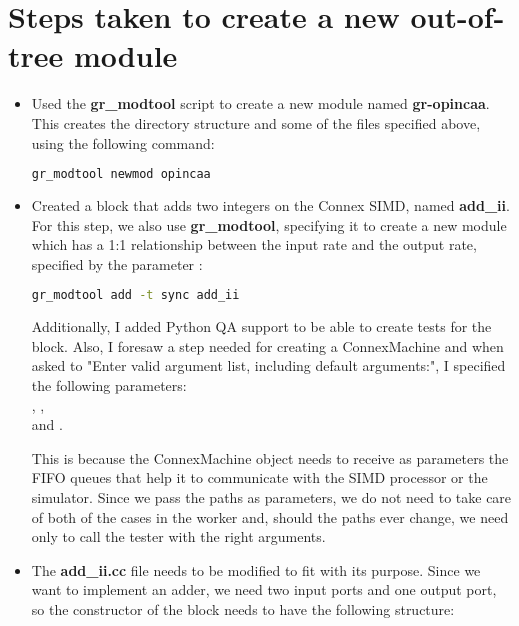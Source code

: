 
\section{Steps taken to create a new out-of-tree module}
\label{sec:steps-oot}
\begin{itemize}
	\item Used the \textbf{gr\_modtool} script to create a new module named
		\textbf{gr-opincaa}. This creates the directory structure and some of the
		files specified above, using the following command:\\
	
		\begin{lstlisting}[language=bash]
gr_modtool newmod opincaa
		\end{lstlisting}
	
	\item Created a block that adds two integers on the Connex SIMD, named
		\textbf{add\_ii}. For this step, we also use \textbf{gr\_modtool},
		specifying it to create a new module which has a 1:1 relationship between
		the input rate and the output rate, specified by the parameter :
	
		\begin{lstlisting}[language=bash]
gr_modtool add -t sync add_ii
		\end{lstlisting}
	
		Additionally, I added Python QA support to be able to create tests for the block.
		Also, I foresaw a step needed for creating a ConnexMachine and when asked to
		"Enter valid argument list, including default arguments:",
		I specified the following parameters:\\
		,
		, \\
		 and
		.

		This is because the ConnexMachine object needs to receive as parameters the
		FIFO queues that help it to communicate with the SIMD processor or the
		simulator. Since we pass the paths as parameters, we do not need to take
		care of both of the cases in the worker and, should the paths ever change,
		we need only to call the tester with the right arguments.

	\item The \textbf{add\_ii.cc} file needs to be modified to fit with its
		purpose. Since we want to implement an adder, we need two input ports and
		one output port, so the constructor of the block needs to have the following
		structure:\\
	

\end{itemize}
